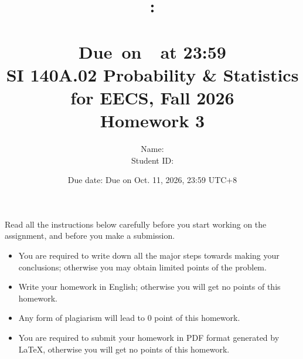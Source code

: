 \documentclass[a4paper]{article}
\title{
    \vspace{2in}
    \textmd{\textbf{\hmwkClass:\\  \hmwkTitle}}\\
    \normalsize\vspace{0.1in}\small{Due\ on\ \hmwkDueDate\ at 23:59}\\
	\vspace{4in}
}
\author{
	Name: \textbf{\hmwkAuthorName} \\
	Student ID: \hmwkAuthorID}
\date{}
\begin{document}

\date{
Due date: Due on Oct. 11, 2026, 23:59 UTC+8}
\title{SI 140A.02  Probability \& Statistics for EECS, Fall 2026 \\
Homework 3}
\maketitle
Read all the instructions below carefully before you start working on the assignment, and before you make a submission.
\begin{itemize}
    \item You are required to write down all the major steps towards making your conclusions; otherwise you may obtain limited points of the problem.
    \item Write your homework in English; otherwise you will get no points of this homework.
    \item Any form of plagiarism will lead to $0$ point of this homework. 
    \item You are required to submit your homework in PDF format generated by LaTeX, otherwise you will get no points of this homework.
\end{itemize}
\newpage
\end{document}
